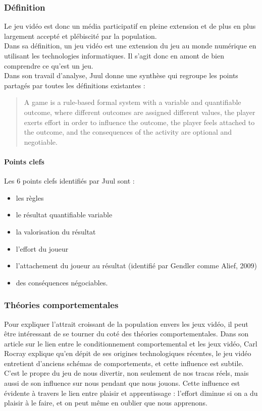 		\subsubsection*{Définition}
Le jeu vidéo est donc un média participatif en pleine extension et de plus en plus largement accepté et plébiscité par la population. \\Dans sa définition, un jeu vidéo est une extension du jeu au monde numérique en utilisant les technologies informatiques. Il s'agit donc en amont de bien comprendre ce qu'est un jeu. \\Dans son travail d’analyse, Juul\cite{Juul05} donne une synthèse qui regroupe les points partagés par toutes les définitions existantes :
\begin{quotation}
A game is a rule-based formal system with a variable and quantifiable outcome, where different outcomes are assigned different values, the player exerts effort in order to influence the outcome, the player feels attached to the outcome, and the consequences of the activity are optional and negotiable. 
\end{quotation}
\paragraph{Points clefs \\}
Les 6 points clefs identifiés par Juul sont :
\begin{itemize}
	\item les règles
	\item le résultat quantifiable variable
	\item la valorisation du résultat
	\item l’effort du joueur
	\item l’attachement du joueur au résultat (identifié par Gendler comme Alief, 2009)
	\item des conséquences négociables.
\end{itemize}

		\subsubsection{Théories comportementales}
Pour expliquer l'attrait croissant de la population envers les jeux vidéo, il peut être intéressant de se tourner du coté des théories comportementales. Dans son article sur le lien entre le conditionnement comportemental et les jeux vidéo, Carl Rocray \cite{Rocr09} explique qu'en dépit de ses origines technologiques récentes, le jeu vidéo entretient d’anciens schémas de comportements, et cette influence est subtile. C’est le propre du jeu de nous divertir, non seulement de nos tracas réels, mais aussi de son influence sur nous pendant que nous jouons. Cette influence est évidente à travers le lien entre plaisir et apprentissage : l’effort diminue si on a du plaisir à le faire, et on peut même en oublier que nous apprenons.

